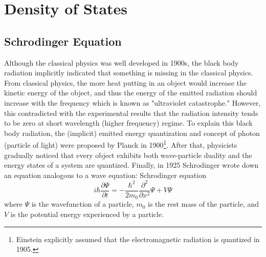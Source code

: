 \chapter{Density of States}
\section{Schrodinger Equation}
Although the classical physics was well developed in 1900s, the black body radiation implicitly indicated that something is missing in the classical physics. From classical physics, the more heat putting in an object would increase the kinetic energy of the object, and thus the energy of the emitted radiation should increase with the frequency which is known as "ultraviolet catastrophe." However, this contradicted with the experimental results that the radiation intensity tends to be zero at short wavelength (higher frequency) regime. To explain this black body radiation, the (implicit) emitted energy quantization and concept of photon (particle of light) were proposed by Planck in 1900\footnote{Einstein explicitly assumed that the electromagnetic radiation is quantized in 1905.}. After that, physicists gradually noticed that every object exhibits both wave-particle duality and the energy states of a system are quantized. Finally, in 1925 Schrodinger wrote down an equation analogous to a wave equation: Schrodinger equation \begin{equation}
    i\hbar\frac{\partial \Psi}{\partial t} = -\frac{\hbar^{2}}{2m_{0}}\frac{\partial^{2}}{\partial x^{2}}\Psi + V\Psi
\end{equation} where $\Psi$ is the wavefunction of a particle, $m_{0}$ is the rest mass of the particle, and $V$ is the potential energy experienced by a particle.
